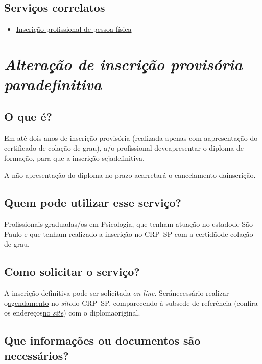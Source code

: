\section{Serviços correlatos}

\begin{itemize}
  \item  \hyperref[]{Inscrição  profissional de pessoa física}
\end{itemize}

\chapter{\texorpdfstring{\emph{Alteração de inscrição provisória paradefinitiva}}{Alteração de inscrição provisória para definitiva}}


\section{O que é?}

Em até dois anos de inscrição provisória (realizada apenas com aapresentação do certificado de colação de grau), a/o profissional deveapresentar o diploma de formação, para que a inscrição sejadefinitiva.

A não apresentação do diploma no prazo acarretará o cancelamento dainscrição.

\section{Quem pode utilizar esse serviço?}

Profissionais graduadas/os em Psicologia, que tenham atuação no estadode São Paulo e que tenham realizado a inscrição no CRP~SP com a certidãode colação de grau.

\section{Como solicitar o serviço?}

A inscrição definitiva pode ser solicitada \emph{on-line}. Seránecessário realizar o\href{https://www.crpsp.org/pagina/view/311}{agendamento} no \emph{site}do CRP~SP, comparecendo à subsede de referência (confira os endereços\href{https://www.crpsp.org/sede/index}{no \emph{site}}) com o diplomaoriginal.

\section{Que informações ou documentos são necessários?}

